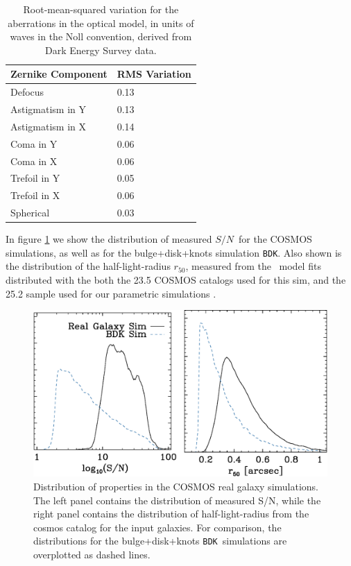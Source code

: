 \documentclass[a4paper,fleqn,usenatbib]{mnras}
\newcommand{\snr}{$S/N$}
\newcommand{\hlr}{$r_{50}$}
\newcommand{\bdsim}{\texttt{BDK}}
\begin{document}
\begin{table}
    \centering
    \caption{Root-mean-squared variation for the aberrations in the optical model,
        in units of waves in the Noll convention, derived 
    from Dark Energy Survey data. \label{tab:aberr}}
    \begin{tabular}{ | l | l | }
        Zernike Component  & RMS Variation \\
        \hline
        Defocus & 0.13 \\
        Astigmatism in Y & 0.13 \\
        Astigmatism in X & 0.14 \\
        Coma in Y & 0.06 \\
        Coma in X & 0.06 \\
        Trefoil in Y & 0.05 \\
        Trefoil in X & 0.06 \\
        Spherical & 0.03 \\

    \end{tabular}
\end{table}

In figure \ref{fig:cosmos} we show the distribution of measured \snr\ for the
COSMOS simulations, as well as for the bulge+disk+knots simulation
\bdsim.  Also shown is the distribution of the half-light-radius \hlr, measured
from the \sersic\ model fits distributed with the both the 23.5 COSMOS catalogs
used for this sim, and the 25.2 sample used for our parametric simulations
\citep{GALSIM2015}.

\begin{figure}
    \centering
    \includegraphics[width=\columnwidth]{mcal-v14s01-s2n-and-r50-with-nsim.eps}

    \caption{Distribution of properties in the COSMOS real galaxy simulations. The
    left panel contains the distribution of measured S/N, while the right panel contains
    the distribution of half-light-radius from the cosmos catalog for the input
    galaxies.  For comparison, the distributions for the bulge+disk+knots \bdsim\ simulations
    are overplotted as dashed lines.}

\label{fig:cosmos}
\end{figure}
\end{document}
